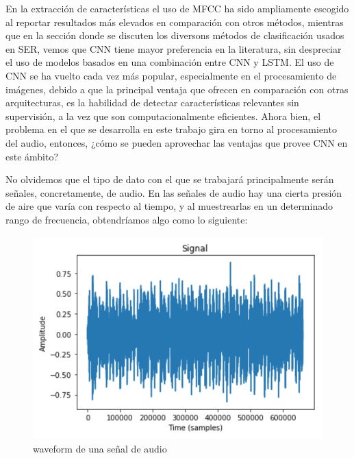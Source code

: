 \documentclass[11pt,a4paper,spanish]{book}
\begin{document}
	En la extracción de características el uso de MFCC ha sido ampliamente escogido al reportar resultados más elevados en comparación con otros métodos, mientras que en la sección donde se discuten los diversons métodos de clasificación usados en SER, vemos que CNN tiene mayor preferencia en la literatura, sin despreciar el uso de modelos basados en una combinación entre CNN y LSTM.\hfill \break
	El uso de CNN se ha vuelto cada vez más popular, especialmente en el procesamiento de imágenes, debido a que la principal ventaja que ofrecen en comparación con otras arquitecturas, es la habilidad de detectar características relevantes sin supervisión, a la vez que son computacionalmente eficientes.
	Ahora bien, el problema en el que se desarrolla en este trabajo gira en torno al procesamiento del audio, entonces, ¿cómo se pueden aprovechar las ventajas que provee CNN en este ámbito?

	No olvidemos que el tipo de dato con el que se trabajará principalmente serán señales, concretamente, de audio. En las señales de audio hay una cierta presión de aire que varía con respecto al tiempo, y al muestrearlas en un determinado rango de frecuencia, obtendríamos algo como lo siguiente:
	
	\begin{figure}[H]
		\includegraphics[scale=0.4]{waveform.png}
		\caption{waveform de una señal de audio}
	\end{figure}
\end{document}
